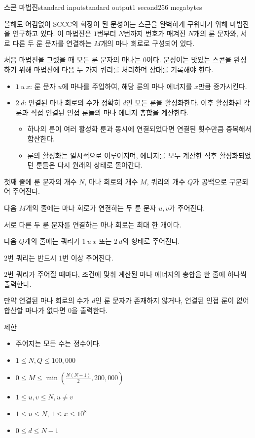 \begin{problem}{스콘 마법진}{standard input}{standard output}{1 second}{256 megabytes}

올해도 어김없이 SCCC의 회장이 된 문성이는 스콘을 완벽하게 구워내기 위해 마법진을 연구하고 있다. 이 마법진은 $1$번부터 $N$번까지 번호가 매겨진 $N$개의 룬 문자와, 서로 다른 두 룬 문자를 연결하는 $M$개의 마나 회로로 구성되어 있다.

처음 마법진을 그렸을 때 모든 룬 문자의 마나는 $0$이다. 문성이는 맛있는 스콘을 완성하기 위해 마법진에 다음 두 가지 쿼리를 처리하며 상태를 기록해야 한다.

\begin{itemize}
    \item $1~u~x$: 룬 문자 $u$에 마나를 주입하여, 해당 룬의 마나 에너지를 $x$만큼 증가시킨다.
    \item $2~d$: 연결된 마나 회로의 수가 정확히 $d$인 모든 룬을 활성화한다. 이후 활성화된 각 룬과 직접 연결된 인접 룬들의 마나 에너지 총합을 계산한다.
    \begin{itemize}
        \item 하나의 룬이 여러 활성화 룬과 동시에 연결되었다면 연결된 횟수만큼 중복해서 합산한다.
        \item 룬의 활성화는 일시적으로 이루어지며, 에너지를 모두 계산한 직후 활성화되었던 룬들은 다시 원래의 상태로 돌아간다.
    \end{itemize}
\end{itemize}

\InputFile
첫째 줄에 룬 문자의 개수 $N$, 마나 회로의 개수 $M$, 쿼리의 개수 $Q$가 공백으로 구분되어 주어진다. 

다음 $M$개의 줄에는 마나 회로가 연결하는 두 룬 문자 $u, v$가 주어진다.

서로 다른 두 룬 문자를 연결하는 마나 회로는 최대 한 개이다.

다음 $Q$개의 줄에는 쿼리가 $1~u~x$ 또는 $2~d$의 형태로 주어진다.

2번 쿼리는 반드시 1번 이상 주어진다.

\OutputFile
$2$번 쿼리가 주어질 때마다, 조건에 맞춰 계산된 마나 에너지의 총합을 한 줄에 하나씩 출력한다.

만약 연결된 마나 회로의 수가 $d$인 룬 문자가 존재하지 않거나, 연결된 인접 룬이 없어 합산할 마나가 없다면 $0$을 출력한다.

\Examples

\begin{example}
%
%
\end{example}

\Note
제한
\begin{itemize}
    \item 주어지는 모든 수는 정수이다.
    \item $1 \le N, Q \le 100,000$
    \item $0 \le M \le \min(\frac{N(N-1)}{2}, 200,000)$
    \item $1 \le u, v \le N, u \neq v$
    \item $1 \le u \le N$, $1 \le x \le 10^8$
    \item $0 \le d \le N-1$
\end{itemize}

\end{problem}

